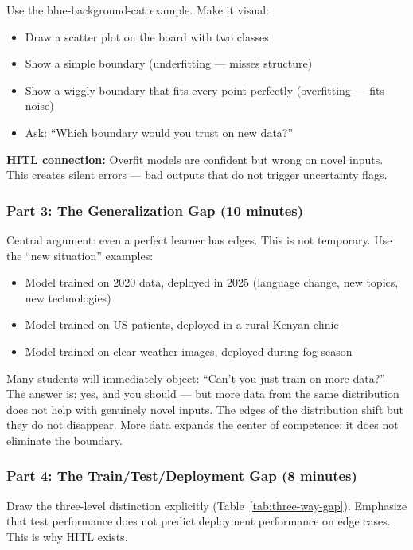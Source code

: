 Use the blue-background-cat example. Make it visual:
\begin{itemize}
    \item Draw a scatter plot on the board with two classes
    \item Show a simple boundary (underfitting --- misses structure)
    \item Show a wiggly boundary that fits every point perfectly (overfitting --- fits noise)
    \item Ask: ``Which boundary would you trust on new data?''
\end{itemize}

\textbf{HITL connection:} Overfit models are confident but wrong on novel inputs. This creates silent errors --- bad outputs that do not trigger uncertainty flags.

\subsubsection{Part 3: The Generalization Gap (10 minutes)}

Central argument: even a perfect learner has edges. This is not temporary. Use the ``new situation'' examples:
\begin{itemize}
    \item Model trained on 2020 data, deployed in 2025 (language change, new topics, new technologies)
    \item Model trained on US patients, deployed in a rural Kenyan clinic
    \item Model trained on clear-weather images, deployed during fog season
\end{itemize}

\begin{keyconcept}
Many students will immediately object: ``Can't you just train on more data?'' The answer is: yes, and you should --- but more data from the same distribution does not help with genuinely novel inputs. The edges of the distribution shift but they do not disappear. More data expands the center of competence; it does not eliminate the boundary.
\end{keyconcept}

\subsubsection{Part 4: The Train/Test/Deployment Gap (8 minutes)}

Draw the three-level distinction explicitly (Table~\ref{tab:three-way-gap}). Emphasize that test performance does not predict deployment performance on edge cases. This is why HITL exists.


